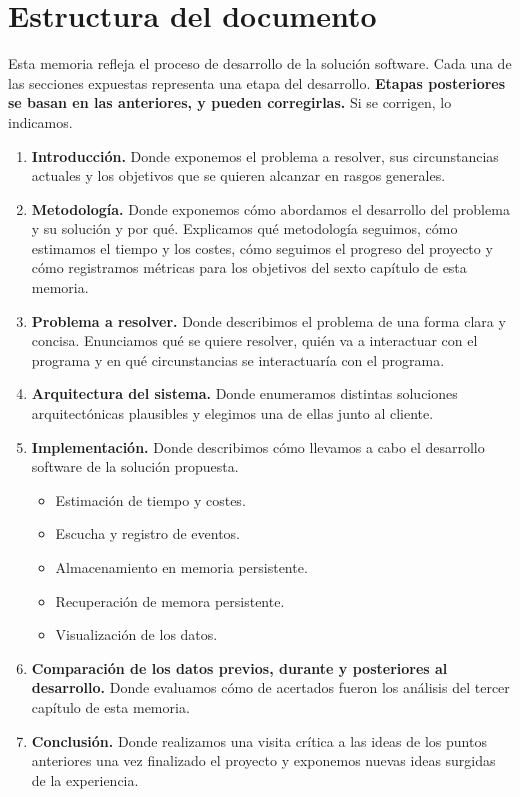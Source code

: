 \section{Estructura del documento}

Esta memoria refleja el proceso de desarrollo de la solución software.
Cada una de las secciones expuestas representa una etapa del desarrollo.
\textbf{Etapas posteriores se basan en las anteriores, y pueden corregirlas.}
Si se corrigen, lo indicamos.

\begin{enumerate}
    \item \textbf{Introducción.} Donde exponemos el problema a resolver,
    sus circunstancias actuales y los objetivos que se quieren alcanzar en rasgos generales.

    \item \textbf{Metodología.} Donde exponemos cómo abordamos el desarrollo del problema y su solución y por qué.
    Explicamos qué metodología seguimos, cómo estimamos el tiempo y los costes, cómo seguimos el progreso
    del proyecto y cómo registramos métricas para los objetivos del sexto capítulo de esta memoria.

    \item \textbf{Problema a resolver.} Donde describimos el problema de una forma clara y concisa.
    Enunciamos qué se quiere resolver, quién va a interactuar con el programa y en qué circunstancias
    se interactuaría con el programa.

    \item \textbf{Arquitectura del sistema.} Donde enumeramos distintas soluciones arquitectónicas
    plausibles y elegimos una de ellas junto al cliente.

    \item \textbf{Implementación.} Donde describimos cómo llevamos a cabo el desarrollo software
    de la solución propuesta.
    \begin{itemize}[noitemsep,nolistsep]
        \item Estimación de tiempo y costes.
        \item Escucha y registro de eventos.
        \item Almacenamiento en memoria persistente.
        \item Recuperación de memora persistente.
        \item Visualización de los datos.
    \end{itemize}

    \item \textbf{Comparación de los datos previos, durante y posteriores al desarrollo.} Donde evaluamos cómo de
    acertados fueron los análisis del tercer capítulo de esta memoria.

    \item \textbf{Conclusión.} Donde realizamos una visita crítica a las ideas de los puntos
    anteriores una vez finalizado el proyecto y exponemos nuevas ideas surgidas de la experiencia.
\end{enumerate}
